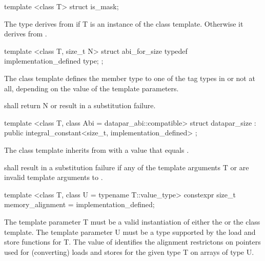 \begin{itemdecl}
template <class T> struct is_mask;
\end{itemdecl}
\begin{itemdescr}
  \pnum The  type derives from  if \type T is an instance of the \mask class template.
  Otherwise it derives from .
\end{itemdescr}

\begin{itemdecl}
template <class T, size_t N> struct abi_for_size { typedef implementation_defined type; };
\end{itemdecl}
\begin{itemdescr}
  \pnum
  The  class template defines the member type  to one of the tag types in  or not at all, depending on the value of the template parameters.

  \pnum
   shall return \code N or result in a substitution failure.
\end{itemdescr}

\begin{itemdecl}
template <class T, class Abi = datapar_abi::compatible>
struct datapar_size : public integral_constant<size_t, implementation_defined> {};
\end{itemdecl}
\begin{itemdescr}
  \pnum The  class template inherits from  with a value that equals \datapar{}.

  \pnum {} shall result in a substitution failure if any of the template arguments \type T or  are invalid template arguments to \datapar.
\end{itemdescr}

\begin{itemdecl}
template <class T, class U = typename T::value_type>
constexpr size_t memory_alignment = implementation_defined;
\end{itemdecl}
\begin{itemdescr}
  \pnum\requires The template parameter \type T must be a valid instantiation of either the \datapar or the \mask class template.
  \pnum\requires The template parameter \type U must be a type supported by the load and store functions for \type T.
  \pnum The value of  identifies the alignment restrictons on pointers used for (converting) loads and stores for the given type \type T on arrays of type \type U.
\end{itemdescr}
